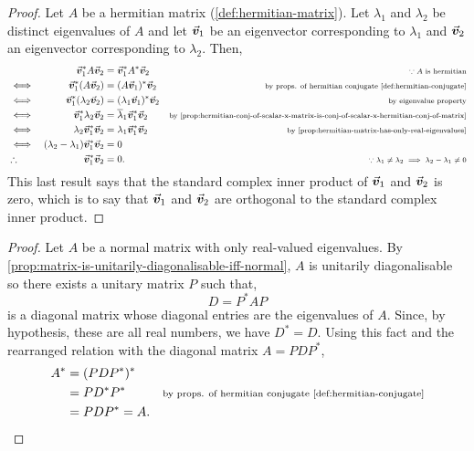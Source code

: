 \documentclass[../MathsNotesBase.tex]{subfiles}
\begin{document}
{		\bigskip
		\begin{proof}
			Let $A$ be a hermitian matrix (\ref{def:hermitian-matrix}). Let $\lambda_1$ and $\lambda_2$ be distinct eigenvalues of $A$ and let $\vec{\bm{v}}_1$ be an eigenvector corresponding to $\lambda_1$ and $\vec{\bm{v}}_2$ an eigenvector corresponding to $\lambda_2$. Then,
			\[\begin{aligned}
				&& \vec{\bm{v}}_1^* A \vec{\bm{v}}_2 &= \vec{\bm{v}}_1^* A^* \vec{\bm{v}}_2     &\text{\scriptsize{$\because A$ is hermitian}}\\
				&\iff & \vec{\bm{v}}_1^* (A \vec{\bm{v}}_2) &= (A \vec{\bm{v}}_1)^* \vec{\bm{v}}_2     &\text{\scriptsize{by props. of hermitian conjugate \ref{def:hermitian-conjugate}}} \\
				&\iff & \vec{\bm{v}}_1^* (\lambda_2 \vec{\bm{v}}_2) &= (\lambda_1 \vec{\bm{v}}_1)^* \vec{\bm{v}}_2    &\text{\scriptsize{by eigenvalue property}} \\
				&\iff & \vec{\bm{v}}_1^* \lambda_2 \vec{\bm{v}}_2 &= \overline{\lambda}_1 \vec{\bm{v}}_1^* \vec{\bm{v}}_2    &\text{\scriptsize{by \ref{prop:hermitian-conj-of-scalar-x-matrix-is-conj-of-scalar-x-hermitian-conj-of-matrix}}} \\
				&\iff & \lambda_2 \vec{\bm{v}}_1^* \vec{\bm{v}}_2 &= \lambda_1 \vec{\bm{v}}_1^* \vec{\bm{v}}_2    &\text{\scriptsize{by \ref{prop:hermitian-matrix-has-only-real-eigenvalues}}} \\
				&\iff & (\lambda_2 - \lambda_1) \vec{\bm{v}}_1^* \vec{\bm{v}}_2 &= 0 \\
				&\therefore & \vec{\bm{v}}_1^* \vec{\bm{v}}_2 &= 0.   &\text{\scriptsize{${ \because \lambda_1 \neq \lambda_2 \implies \lambda_2 - \lambda_1 \neq 0 }$}}
			\end{aligned}\]
			This last result says that the standard complex inner product of $\vec{\bm{v}}_1$ and $\vec{\bm{v}}_2$ is zero, which is to say that $\vec{\bm{v}}_1$ and $\vec{\bm{v}}_2$ are orthogonal \wrt to the standard complex inner product.
		\end{proof}
		
	
	
		\bigskip
		\begin{proof}
			Let $A$ be a normal matrix with only real-valued eigenvalues. By \autoref{prop:matrix-is-unitarily-diagonalisable-iff-normal}, $A$ is unitarily diagonalisable so there exists a unitary matrix $P$ such that,
			\[ D = P^* A P \]
			is a diagonal matrix whose diagonal entries are the eigenvalues of $A$. Since, by hypothesis, these are all real numbers, we have ${ D^* = D }$. Using this fact and the rearranged relation with the diagonal matrix ${ A = P D P^* }$,
			\[\begin{aligned}
				A^* &= (P D P^*)^* \\
				&= P D^* P^* &\text{\scriptsize{by props. of hermitian conjugate \ref{def:hermitian-conjugate}}} \\
				&= P D P^* = A.
			\end{aligned}\]
			

\end{proof}}
\end{document}

